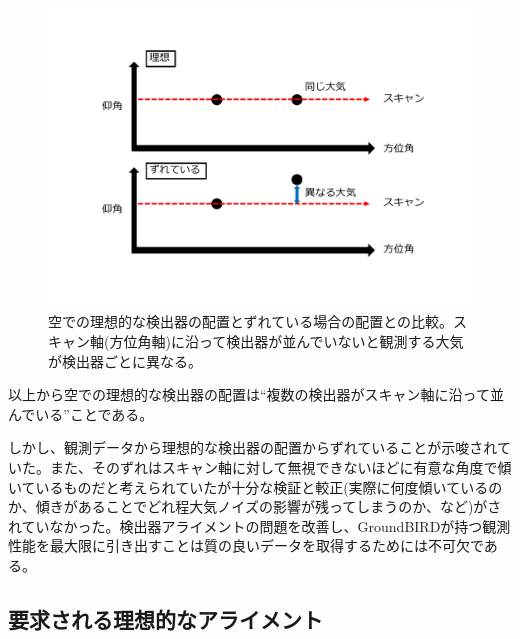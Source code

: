 \begin{figure}[htbp]
  \centering
  \includegraphics[width=0.7\columnwidth]{5_alignment/figs/scan_axis.pdf}
  \caption{空での理想的な検出器の配置とずれている場合の配置との比較。スキャン軸(方位角軸)に沿って検出器が並んでいないと観測する大気が検出器ごとに異なる。}
  \label{scan_axis}
\end{figure}

以上から空での理想的な検出器の配置は``複数の検出器がスキャン軸に沿って並んでいる''ことである。

しかし、観測データから理想的な検出器の配置からずれていることが示唆されていた。また、そのずれはスキャン軸に対して無視できないほどに有意な角度で傾いているものだと考えられていたが十分な検証と較正(実際に何度傾いているのか、傾きがあることでどれ程大気ノイズの影響が残ってしまうのか、など)がされていなかった。検出器アライメントの問題を改善し、GroundBIRDが持つ観測性能を最大限に引き出すことは質の良いデータを取得するためには不可欠である。

\subsection{要求される理想的なアライメント}

